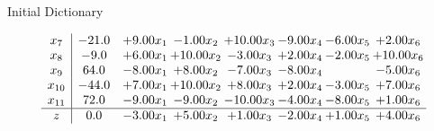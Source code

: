 \documentclass[8pt]{article}
\begin{document}
Initial Dictionary 

\[\begin{array}{c| c c@{\hskip 2pt} c@{\hskip 2pt} c@{\hskip 2pt} c@{\hskip 2pt} c@{\hskip 2pt} c@{\hskip 2pt} }
 x_{7}   &  -21.0 & +  9.00 x_{1} & -1.00 x_{2} & + 10.00 x_{3} & -9.00 x_{4} & -6.00 x_{5} & +  2.00 x_{6}\\
 x_{8}   &  -9.0 & +  6.00 x_{1} & + 10.00 x_{2} & -3.00 x_{3} & +  2.00 x_{4} & -2.00 x_{5} & + 10.00 x_{6}\\
 x_{9}   &  64.0 & -8.00 x_{1} & +  8.00 x_{2} & -7.00 x_{3} & -8.00 x_{4} &   & -5.00 x_{6}\\
 x_{10}   &  -44.0 & +  7.00 x_{1} & + 10.00 x_{2} & +  8.00 x_{3} & +  2.00 x_{4} & -3.00 x_{5} & +  7.00 x_{6}\\
 x_{11}   &  72.0 & -9.00 x_{1} & -9.00 x_{2} & -10.00 x_{3} & -4.00 x_{4} & -8.00 x_{5} & +  1.00 x_{6}\\
\hline
z    &  0.0 & -3.00 x_{1} & +  5.00 x_{2} & +  1.00 x_{3} & -2.00 x_{4} & +  1.00 x_{5} & +  4.00 x_{6}\\
\end{array}\]
\end{document}

